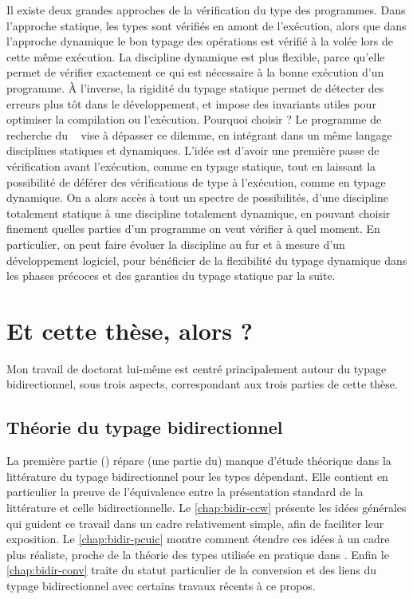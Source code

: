 Il existe deux grandes approches de la vérification du type des programmes.
Dans l’approche statique,
les types sont vérifiés en amont de l’exécution, alors que dans l’approche dynamique le bon typage des opérations est vérifié à la volée lors de cette même exécution.
La discipline dynamique est plus flexible, parce qu’elle permet de vérifier exactement ce qui est nécessaire à la bonne exécution d’un programme.
À l’inverse, la rigidité du typage statique permet de détecter des erreurs plus tôt dans le développement, et impose des invariants utiles pour optimiser la compilation ou l’exécution.
Pourquoi choisir ? Le programme de recherche du ~ vise à dépasser ce dilemme, en intégrant dans un même langage disciplines statiques et dynamiques.
L’idée est d’avoir une première passe de vérification avant l’exécution, comme en typage statique, tout en laissant la possibilité de déférer des vérifications de type à l’exécution, comme en typage dynamique.
On a alors accès à tout un spectre de possibilités, d’une discipline totalement statique à une discipline totalement dynamique,
en pouvant choisir finement quelles parties d’un programme on veut vérifier à quel moment. En particulier, on peut faire évoluer la discipline au fur et à mesure d’un développement logiciel, pour bénéficier de la flexibilité du typage dynamique dans les phases précoces et des garanties du typage statique par la suite.

\section{Et cette thèse, alors ?}
\label{sec:cette-these}

Mon travail de doctorat lui-même
est centré principalement autour du typage bidirectionnel, sous
trois aspects, correspondant aux trois parties de cette thèse.

\subsection{Théorie du typage bidirectionnel}

La première partie () répare (une partie du) manque d'étude
théorique dans la littérature du typage bidirectionnel pour les types dépendant. Elle contient en particulier la
preuve de l’équivalence entre la présentation standard de la littérature et celle
bidirectionnelle.
Le \cref{chap:bidir-ccw} présente les idées générales qui guident ce travail
dans un cadre relativement simple, afin de faciliter leur exposition. 
Le \cref{chap:bidir-pcuic} montre comment étendre ces idées à un
cadre plus réaliste, proche de la théorie des types utilisée en pratique dans .
Enfin le \cref{chap:bidir-conv} traite du statut particulier de la
conversion
et des liens du typage bidirectionnel avec certains travaux récents
à ce propos.


